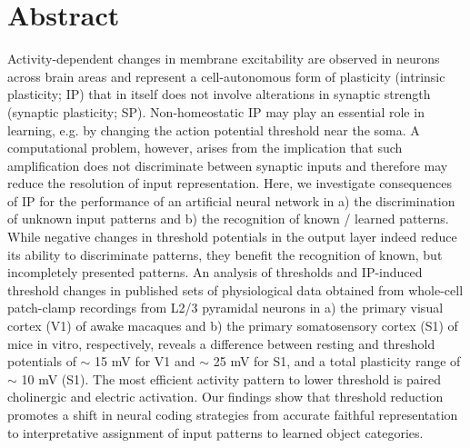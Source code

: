 \section{Abstract}

Activity-dependent changes in membrane excitability
    are observed in neurons across brain areas
    and represent a cell-autonomous form of plasticity (intrinsic plasticity; IP)
    that in itself does not involve alterations in synaptic strength (synaptic plasticity; SP).
Non-homeostatic IP may play an essential role in learning,
    e.g. by changing the action potential threshold near the soma.
A computational problem, however, arises from the implication that
    such amplification does not discriminate between synaptic inputs
    and therefore may reduce the resolution of input representation.
Here, we investigate consequences of IP for the performance of an artificial neural network in
    a) the discrimination of unknown input patterns
    and b) the recognition of known / learned patterns.
While negative changes in threshold potentials in the output layer
    indeed reduce its ability to discriminate patterns,
    they benefit the recognition of known, but incompletely presented patterns.
An analysis of thresholds and IP-induced threshold changes
    in published sets of physiological data obtained
    from whole-cell patch-clamp recordings
    from L2/3 pyramidal neurons in
    a) the primary visual cortex (V1) of awake macaques
    and b) the primary somatosensory cortex (S1) of mice in vitro, respectively,
    reveals a difference between resting and threshold potentials
    of $\sim$ 15 mV for V1
    and $\sim$ 25 mV for S1,
    and a total plasticity range of $\sim$ 10 mV (S1).
The most efficient activity pattern to lower threshold is paired cholinergic and electric activation.
Our findings show that threshold reduction
    promotes a shift in neural coding strategies
    from accurate faithful representation to interpretative assignment of input patterns to learned object categories.
